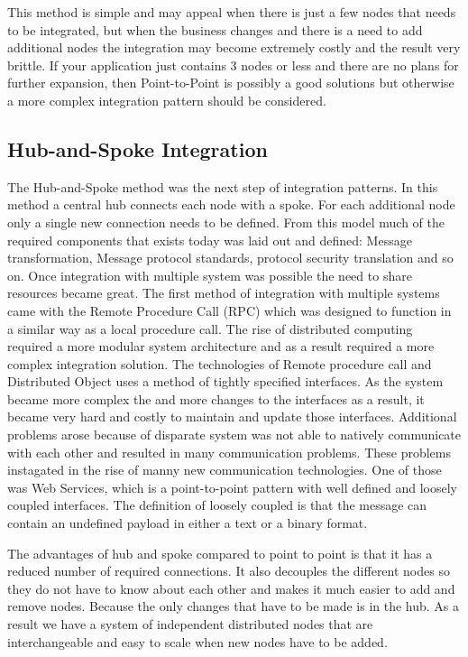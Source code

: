 \documentclass{llncs}
\begin{document}
This method is simple and may appeal when there is just a few nodes that needs to be integrated, but when the business changes and there is a need to add additional nodes the integration may become extremely costly and the result very brittle. If your application just contains 3 nodes or less and there are no plans for further expansion, then Point-to-Point is possibly a good solutions but otherwise a more complex integration pattern should be considered.


\subsection{Hub-and-Spoke Integration}
The Hub-and-Spoke method was the next step of integration patterns. In this method a central hub connects each node with a spoke. For each additional node only a single new connection needs to be defined. From this model much of the required components that exists today was laid out and defined: Message transformation, Message protocol standards, protocol security translation and so on. Once integration with multiple system was possible the need to share resources became great. The first method of integration with multiple systems came with the Remote Procedure Call (RPC) which was designed to function in a similar way as a local procedure call. The rise of distributed computing required a more modular system architecture and as a result required a more complex integration solution. The technologies of Remote procedure call and Distributed Object uses a method of tightly specified interfaces. As the system became more complex the and more changes to the interfaces as a result, it became very hard and costly to maintain and update those interfaces. Additional problems arose because of disparate system was not able to natively communicate with each other and resulted in many communication problems. These problems instagated in the rise of manny new communication technologies. One of those was Web Services, which is a point-to-point pattern with well defined and loosely coupled interfaces. The definition of loosely coupled is that the message can contain an undefined payload in either a text or a binary format.

The advantages of hub and spoke compared to point to point is that it has a reduced number of required connections. It also decouples the different nodes so they do not have to know about each other and makes it much easier to add and remove nodes. Because the only changes that have to be made is in the hub. As a result we have a system of independent distributed nodes that are interchangeable and easy to scale when new nodes have to be added.
\end{document}
